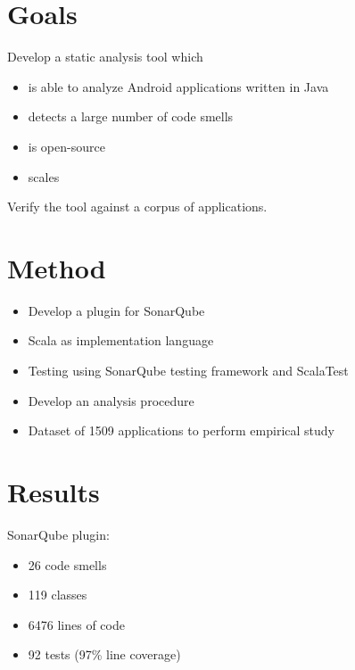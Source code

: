 \documentclass{beamer}
\begin{document}
    \section{Goals}\label{sec:goals}
    \begin{frame}{\secname}
        Develop a static analysis tool which
        \begin{itemize}
            \item is able to analyze Android applications written in Java
            \item detects a large number of code smells
            \item is open-source
            \item scales
        \end{itemize}

        \begin{flushleft}
            Verify the tool against a corpus of applications.
        \end{flushleft}
    \end{frame}

    \section{Method}\label{sec:method}
    \begin{frame}{\secname}
        \begin{itemize}
            \item Develop a plugin for SonarQube
            \item Scala as implementation language
            \item Testing using SonarQube testing framework and ScalaTest
            \item Develop an analysis procedure
            \item Dataset of 1509 applications to perform empirical study
        \end{itemize}
    \end{frame}

    \section{Results}\label{sec:results}
    \begin{frame}{\secname}
        SonarQube plugin:
        \begin{itemize}
            \item 26 code smells
            \item 119 classes
            \item 6476 lines of code
            \item 92 tests (97\% line coverage)
        \end{itemize}
    \end{frame}
\end{document}
